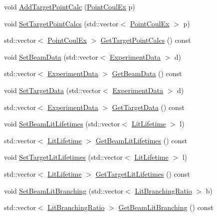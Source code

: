 \begin{DoxyCompactItemize}
void \hyperlink{classCoulExSimFitter_a256b37098b33f916f4c5f4eec14cf477}{Add\-Target\-Point\-Calc} (\hyperlink{classPointCoulEx}{Point\-Coul\-Ex} p)
\item 
void \hyperlink{classCoulExSimFitter_a83fed4de27046f0f8cfaff70c824c763}{Set\-Target\-Point\-Calcs} (std\-::vector$<$ \hyperlink{classPointCoulEx}{Point\-Coul\-Ex} $>$ p)
\item 
std\-::vector$<$ \hyperlink{classPointCoulEx}{Point\-Coul\-Ex} $>$ \hyperlink{classCoulExSimFitter_aa15df5dc8fafe7ad453006e3e25eb627}{Get\-Target\-Point\-Calcs} () const 
\item 
void \hyperlink{classCoulExSimFitter_a59ebba363d2aba7df840ed47cdbb8aa2}{Set\-Beam\-Data} (std\-::vector$<$ \hyperlink{classExperimentData}{Experiment\-Data} $>$ d)
\item 
std\-::vector$<$ \hyperlink{classExperimentData}{Experiment\-Data} $>$ \hyperlink{classCoulExSimFitter_a6b6c20a2ad583d4683b319fe95fecb61}{Get\-Beam\-Data} () const 
\item 
void \hyperlink{classCoulExSimFitter_aec8080c3f8a0edbce8400a6eaf935bb1}{Set\-Target\-Data} (std\-::vector$<$ \hyperlink{classExperimentData}{Experiment\-Data} $>$ d)
\item 
std\-::vector$<$ \hyperlink{classExperimentData}{Experiment\-Data} $>$ \hyperlink{classCoulExSimFitter_a555360856a255d85185a9af58d4ea9d0}{Get\-Target\-Data} () const 
\item 
void \hyperlink{classCoulExSimFitter_a5fd88c4d7e5f06ed956e4729f74a6cdc}{Set\-Beam\-Lit\-Lifetimes} (std\-::vector$<$ \hyperlink{classLitLifetime}{Lit\-Lifetime} $>$ l)
\item 
std\-::vector$<$ \hyperlink{classLitLifetime}{Lit\-Lifetime} $>$ \hyperlink{classCoulExSimFitter_aae5fb8ff0de05e1cf93ae3a6fd28f04e}{Get\-Beam\-Lit\-Lifetimes} () const 
\item 
void \hyperlink{classCoulExSimFitter_a9a3619c2164f23b35e484774eb115b9e}{Set\-Target\-Lit\-Lifetimes} (std\-::vector$<$ \hyperlink{classLitLifetime}{Lit\-Lifetime} $>$ l)
\item 
std\-::vector$<$ \hyperlink{classLitLifetime}{Lit\-Lifetime} $>$ \hyperlink{classCoulExSimFitter_ab24c12957304e58e370056e17fd2d63f}{Get\-Target\-Lit\-Lifetimes} () const 
\item 
void \hyperlink{classCoulExSimFitter_acfbdfe58274083ab962aa3ab1e29317f}{Set\-Beam\-Lit\-Branching} (std\-::vector$<$ \hyperlink{classLitBranchingRatio}{Lit\-Branching\-Ratio} $>$ b)
\item 
std\-::vector$<$ \hyperlink{classLitBranchingRatio}{Lit\-Branching\-Ratio} $>$ \hyperlink{classCoulExSimFitter_a45e7174fece6d9febbb881931247d009}{Get\-Beam\-Lit\-Branching} () const 

\end{DoxyCompactItemize}
